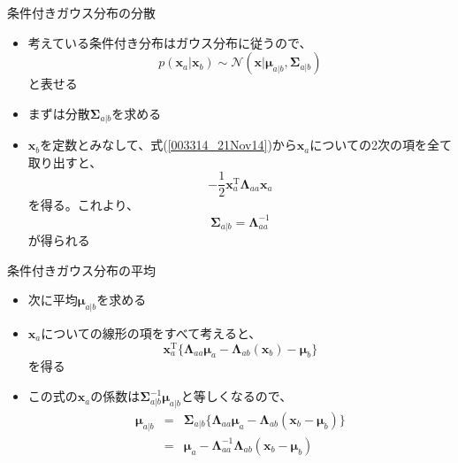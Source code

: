 \begin{frame}{条件付きガウス分布の分散}
 \begin{itemize}
  \item 考えている条件付き分布はガウス分布に従うので、
        \begin{equation}
         p(\bm{x}_a | \bm{x}_b) \sim \mathcal{N}(\bm{x} | \bm{\mu}_{a|b}, \bm{\Sigma}_{a|b})
        \end{equation}
        と表せる
  \item まずは分散$\bm{\Sigma}_{a|b}$を求める
  \item $\bm{x}_b$を定数とみなして、式(\ref{003314_21Nov14})から$\bm{x}_a$についての2次の項を全て取り出すと、
        \begin{equation}
         -\frac{1}{2}\bm{x}_a^{\mathrm{T}}\bm{\Lambda}_{aa}\bm{x}_a
        \end{equation}
        を得る。これより、
        \begin{equation}
         \bm{\Sigma}_{a|b} = \bm{\Lambda}_{aa}^{-1}
        \end{equation}
        が得られる
 \end{itemize}
\end{frame}

\begin{frame}{条件付きガウス分布の平均}
 \begin{itemize}
  \item 次に平均$\bm{\mu}_{a|b}$を求める
  \item $\bm{x}_a$についての線形の項をすべて考えると、
        \begin{equation}
         \bm{x}_a^{\mathrm{T}}\{ \bm{\Lambda}_{aa}\bm{\mu}_a-\bm{\Lambda}_{ab}(\bm{x}_b)-\bm{\mu}_b\}
        \end{equation}
        を得る
  \item この式の$\bm{x}_a$の係数は$\bm{\Sigma}^{-1}_{a|b}\bm{\mu}_{a|b}$と等しくなるので、
        \begin{eqnarray}
         \bm{\mu}_{a|b} &=& \bm{\Sigma}_{a|b}\{\bm{\Lambda}_{aa}\bm{\mu}_a-\bm{\Lambda}_{ab}(\bm{x}_b-\bm{\mu}_b)\}\\
         &= & \bm{\mu}_a - \bm{\Lambda}_{aa}^{-1}\bm{\Lambda}_{ab}(\bm{x}_b-\bm{\mu}_b)
        \end{eqnarray}
 \end{itemize}
\end{frame}

